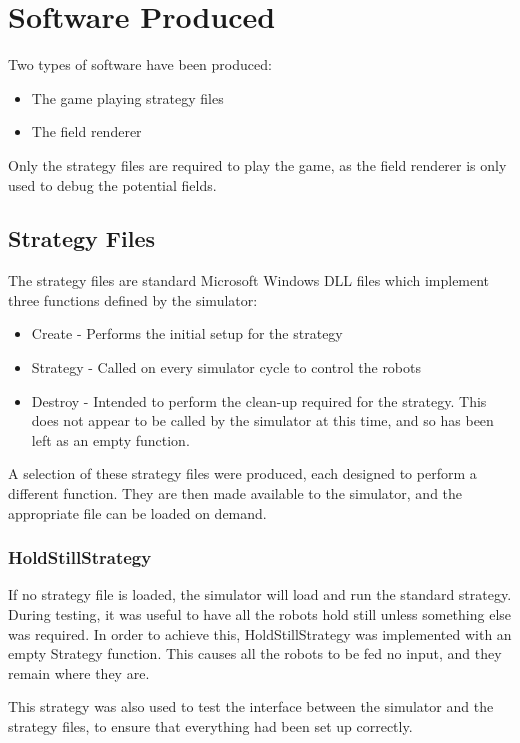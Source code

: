 \documentclass[10pt]{article}
\begin{document}
\section{Software Produced}

Two types of software have been produced:
\begin{itemize}
\item The game playing strategy files
\item The field renderer
\end{itemize}

Only the strategy files are required to play the game, as the field renderer is
only used to debug the potential fields.

\subsection{Strategy Files}

The strategy files are standard Microsoft Windows DLL files which
implement three functions defined by the simulator:
\begin{itemize}
\item Create - Performs the initial setup for the strategy
\item Strategy - Called on every simulator cycle to control the robots
\item Destroy - Intended to perform the clean-up required for the strategy.
This does not appear to be called by the simulator at this time, and so has been
 left as an empty function.
\end{itemize}

A selection of these strategy files were produced, each designed to perform a
different function.  They are then made available to the simulator, and the
appropriate file can be loaded on demand.

\subsubsection{HoldStillStrategy}

If no strategy file is loaded, the simulator will load and run the standard
strategy.  During testing, it was useful to have all the robots hold still
unless something else was required.  In order to achieve this, HoldStillStrategy
was implemented with an empty Strategy function.  This causes all the robots to
be fed no input, and they remain where they are.

This strategy was also used to test the interface between the simulator and the
strategy files, to ensure that everything had been set up correctly.
\end{document}
